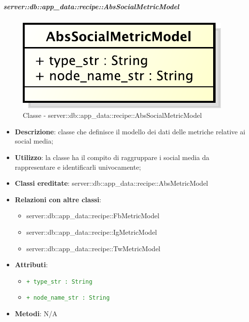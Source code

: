 		\subparagraph{server::db::app\_data::recipe::AbsSocialMetricModel} %
		\label{subp:server_db_app_data_recipe_abssocialmetricmodel}
			\begin{figure}[htbp]
				\centering
				\centerline{\includegraphics[scale=0.75]{./images/server/classes/db/abs_social_metric_model.pdf}}
				\caption{Classe - server::db::app\_data::recipe::AbsSocialMetricModel}
			\end{figure}
			\begin{itemize}
				\item \textbf{Descrizione}: classe che definisce il modello dei dati delle metriche relative ai social media;
				\item \textbf{Utilizzo}: la classe ha il compito di raggruppare i social media da rappresentare e identificarli univocamente;
				\item \textbf{Classi ereditate}: server::db::app\_data::recipe::AbsMetricModel
				\item \textbf{Relazioni con altre classi}:
					\begin{itemize}
						\item server::db::app\_data::recipe::FbMetricModel
						\item server::db::app\_data::recipe::IgMetricModel
						\item server::db::app\_data::recipe::TwMetricModel
					\end{itemize}
				\item \textbf{Attributi}:
					\begin{itemize}
						\item \textcolor{forestgreen}{\texttt{+ type\_str : String}}
						\item \textcolor{forestgreen}{\texttt{+ node\_name\_str : String}}
					\end{itemize}
				\item \textbf{Metodi}: N/A
			\end{itemize}


